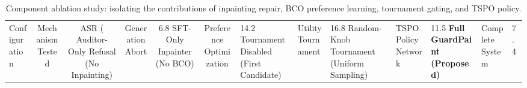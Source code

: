 \begin{table}
\caption{Component ablation study: isolating the contributions of inpainting repair, BCO preference learning, tournament gating, and TSPO policy.}
\label{tab:ablation}
\begin{tabular}{lccccc}
\toprule
Configuration & Mechanism Tested & ASR (%
\midrule
Auditor-Only Refusal (No Inpainting) & Generation Abort & 6.8%
SFT-Only Inpainter (No BCO) & Preference Optimization & 14.2%
Tournament Disabled (First Candidate) & Utility Tournament & 16.8%
Random-Knob Tournament (Uniform Sampling) & TSPO Policy Network & 11.5%
\textbf{Full GuardPaint (Proposed)} & Complete System & 7.4%
\bottomrule
\end{tabular}
\end{table}

